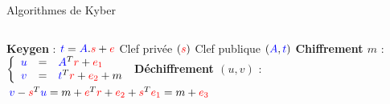 \begin{frame}{Algorithmes de Kyber}
    \begin{columns}[c]
            \begin{outline}
                \1 \textbf{Keygen} : $\textcolor{blue}{t} = \textcolor{blue}{A}. \textcolor{red}{s}+\textcolor{red}{e}$ 
                    \2 Clef privée $(\textcolor{red}{s})$
                    \2 Clef publique $(\textcolor{blue}{A},\textcolor{blue}{t})$
                \pause
                \1 \textbf{Chiffrement $m$} : 
                    \2 $\left\{
                \begin{array}{c c l}
                   \textcolor{blue}{u} & = & \textcolor{blue}{A}^T\textcolor{red}{r} + \textcolor{red}{e_1}\\
                   \textcolor{blue}{v} & = & \textcolor{blue}{t}^T\textcolor{red}{r}+\textcolor{red}{e_2} + m\\
                \end{array}
                \right.$
                \pause
                \1 \textbf{Déchiffrement $(u,v)$} : 
                    \2 $\textcolor{blue}{v}-\textcolor{red}{s}^T\textcolor{blue}{u} = m +\textcolor{red}{e}^T\textcolor{red}{r}+\textcolor{red}{e_2} + \textcolor{red}{s}^T\textcolor{red}{e_1} = m + \textcolor{red}{e_3}$
                \end{outline}
        \begin{center}   
\end{center}
\end{columns}
\end{frame}
